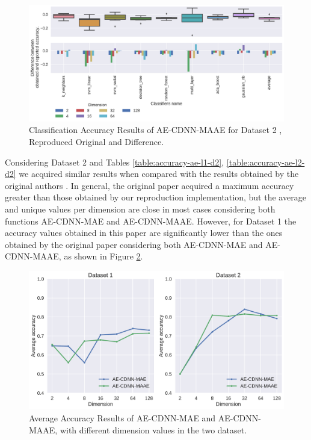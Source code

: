 \begin{figure}[!ht]
  \centering
  \includegraphics[width=\linewidth]{figure/table_5.pdf}
  \caption{Classification Accuracy Results of AE-CDNN-MAAE for Dataset 2 \cite{WenZha:2018}, Reproduced Original and Difference.}
\label{fig:acc-AE-CDNN-MAAE-d2}
\end{figure}


\newpage

Considering Dataset 2 and Tables \ref{table:accuracy-ae-l1-d2}, \ref{table:accuracy-ae-l2-d2} we acquired similar results when compared with the results obtained by the original authors \cite{WenZha:2018}. In general, the original paper acquired a maximum accuracy greater than those obtained by our reproduction implementation, but the average and unique values per dimension are close in most cases considering both functions AE-CDNN-MAE and AE-CDNN-MAAE. However, for Dataset 1 the accuracy values obtained in this paper are significantly lower than the ones obtained by the original paper considering both AE-CDNN-MAE and AE-CDNN-MAAE, as shown in Figure \ref{fig:average}. 

\newpage


\begin{figure}[!ht]
\centering
\includegraphics[width=0.8\linewidth]{figure/average.pdf}
  \caption{Average Accuracy Results of AE-CDNN-MAE and AE-CDNN-MAAE, with different dimension values in the two dataset.}
\label{fig:average}
\end{figure}

